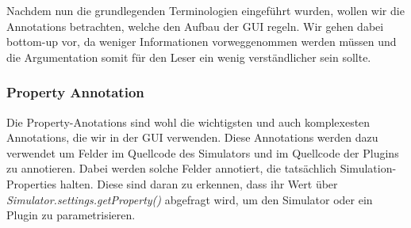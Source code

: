 \documentclass[a4paper, 11pt]{article} %
\begin{document}
Nachdem nun die grundlegenden Terminologien eingeführt wurden, wollen wir die Annotations betrachten, welche den Aufbau der GUI regeln. Wir gehen dabei bottom-up vor, da weniger Informationen vorweggenommen werden müssen und die Argumentation somit für den Leser ein wenig verständlicher sein sollte.

\subsubsection{Property Annotation} %
\label{ssub:feld_annotation}
Die Property-Anotations sind wohl die wichtigsten und auch komplexesten Annotations, die wir in der GUI verwenden. Diese Annotations werden dazu verwendet um Felder im Quellcode des Simulators und im Quellcode der Plugins zu annotieren. Dabei werden solche Felder annotiert, die tatsächlich Simulation-Properties halten. Diese sind daran zu erkennen, dass ihr Wert über \emph{Simulator.settings.getProperty()} abgefragt wird, um den Simulator oder ein Plugin zu parametrisieren.\\
\end{document}
